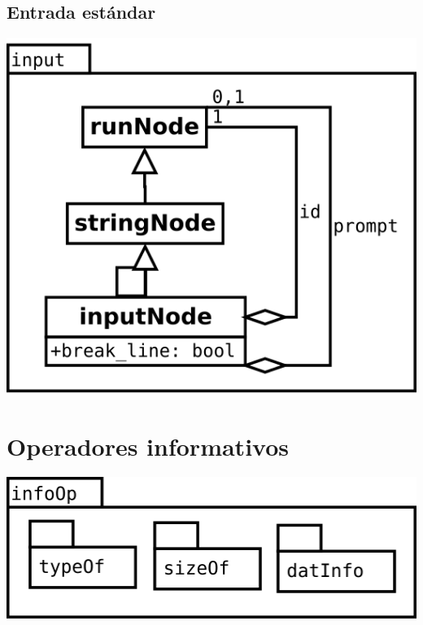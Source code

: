 \subsection {Entrada estándar} 
\begin{center}
\includegraphics[scale=0.4]{input.png} \\
\end{center}
\pagebreak
\section {Operadores informativos} 
\begin{center}
\includegraphics[scale=0.4]{infoOp-package.png} \\
\end{center}


